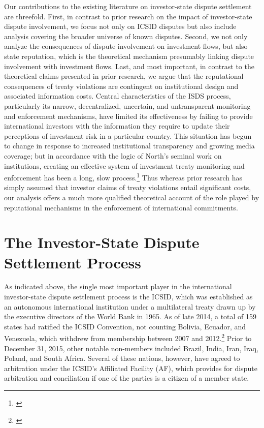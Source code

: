 \documentclass[12pt,onesided]{amsart}
\begin{document}
Our contributions to the existing literature on investor-state dispute settlement are threefold. First, in contrast to prior research on the impact of investor-state dispute involvement, we focus not only on ICSID disputes but also include analysis covering the broader universe of known disputes. Second, we not only analyze the consequences of dispute involvement on investment flows, but also state reputation, which is the theoretical mechanism presumably linking dispute involvement with investment flows. Last, and most important, in contrast to the theoretical claims presented in prior research, we argue that the reputational consequences of treaty violations are contingent on institutional design and associated information costs. Central characteristics of the ISDS process, particularly its narrow, decentralized, uncertain, and untransparent monitoring and enforcement mechanisms, have limited its effectiveness by failing to provide international investors with the information they require to update their perceptions of investment risk in a particular country. This situation has begun to change in response to increased institutional transparency and growing media coverage; but in accordance with the logic of North's seminal work on institutions, creating an effective system of investment treaty monitoring and enforcement has been a long, slow process.\footnote{\citet[p. 60]{north1990institutions}} Thus whereas prior research has simply assumed that investor claims of treaty violations entail significant costs, our analysis offers a much more qualified theoretical account of the role played by reputational mechanisms in the enforcement of international commitments.

\section*{The Investor-State Dispute Settlement Process}

As indicated above, the single most important player in the international investor-state dispute settlement process is the ICSID, which was established as an autonomous international institution under a multilateral treaty drawn up by the executive directors of the World Bank in 1965. As of late 2014, a total of 159 states had ratified the ICSID Convention, not counting Bolivia, Ecuador, and Venezuela, which withdrew from membership between 2007 and 2012.\footnote{\citet{icsid:2014b}}  Prior to December 31, 2015, other notable non-members included Brazil, India, Iran, Iraq, Poland, and South Africa. Several of these nations, however, have agreed to arbitration under the ICSID's Affiliated Facility (AF), which provides for dispute arbitration and conciliation if one of the parties is a citizen of a member state. 
\end{document}
